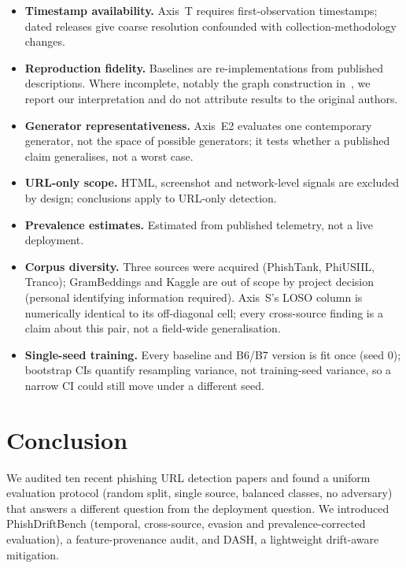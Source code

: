 \documentclass[conference]{IEEEtran}
\begin{document}
\begin{itemize}
\item \textbf{Timestamp availability.} Axis~T requires first-observation
      timestamps; dated releases give coarse resolution confounded with
      collection-methodology changes.
\item \textbf{Reproduction fidelity.} Baselines are re-implementations
      from published descriptions. Where incomplete, notably the graph construction in~\cite{remya2025bgl},
      we report our interpretation and do not attribute results to the original
      authors.
\item \textbf{Generator representativeness.} Axis~E2 evaluates one
      contemporary generator, not the space of possible generators; it
      tests whether a published claim generalises, not a worst case.
\item \textbf{URL-only scope.} HTML, screenshot and network-level
      signals are excluded by design; conclusions apply to URL-only
      detection.
\item \textbf{Prevalence estimates.} Estimated from published telemetry,
      not a live deployment.
\item \textbf{Corpus diversity.} Three sources were acquired (PhishTank,
      PhiUSIIL, Tranco); GramBeddings and Kaggle are out of scope by
      project decision (personal identifying information required).
      Axis~S's LOSO column is numerically identical to its off-diagonal
      cell; every cross-source finding is a claim about this pair, not a
      field-wide generalisation.
\item \textbf{Single-seed training.} Every baseline and B6/B7 version is
      fit once (seed 0); bootstrap CIs quantify resampling variance, not training-seed variance, so a narrow CI could still move under a
      different seed.
\end{itemize}

\section{Conclusion}

We audited ten recent phishing URL detection papers and found a uniform evaluation protocol (random split, single source, balanced
classes, no adversary) that answers a different question from the deployment
question. We introduced PhishDriftBench (temporal, cross-source, evasion
and prevalence-corrected evaluation), a feature-provenance audit, and
DASH, a lightweight drift-aware mitigation.
\end{document}
